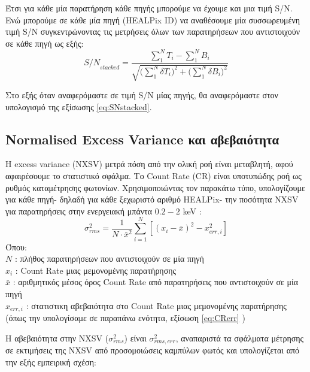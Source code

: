 Έτσι για κάθε μία παρατήρηση κάθε πηγής μπορούμε να έχουμε και μια τιμή \textlatin{S/N}.
Ενώ μπορούμε σε κάθε μία πηγή (\textlatin{HEALPix ID}) να αναθέσουμε μία συσσωρευμένη τιμή \textlatin{S/N} συγκεντρώνοντας τις μετρήσεις όλων των παρατηρήσεων που αντιστοιχούν σε κάθε πηγή ως εξής:
 \begin{equation} {S/N}_{stacked} =   \dfrac { \sum_1^N T_i -  \sum_1^N  B_i}{\sqrt{ \big(\sum_1^N \delta T_i \big)^2 + \big(\sum_1^N \delta B_i \big)^2}} \label{eq:SNstacked}\end{equation} 
 
Στο εξής όταν αναφερόμαστε σε τιμή \textlatin{S/N} μίας πηγής, θα αναφερόμαστε στον υπολογισμό της εξίσωσης \ref{eq:SNstacked}.
   
\subsection{\textlatin{Νormalised Excess Variance} και αβεβαιότητα }

H \textlatin{excess variance (NXSV)} μετρά πόση από την ολική ροή είναι μεταβλητή, αφού αφαιρέσουμε το στατιστικό σφάλμα. Το \textlatin{Count Rate (CR)} είναι υποτυπώδης ροή ως ρυθμός καταμέτρησης φωτονίων. Χρησιμοποιώντας τον παρακάτω τύπο, υπολογίζουμε για κάθε πηγή- δηλαδή για κάθε ξεχωριστό αριθμό \textlatin{HEALPix}- την ποσότητα \textlatin{NXSV} για παρατηρήσεις στην ενεργειακή μπάντα $0.2-2$ \textlatin{keV} \cite{1997ApJ...476...70N}: 
    \begin{equation} \sigma^2_{rms} = \frac{1}{N \cdot {\bar x}^2 }   \sum_{i=1}^{N}  [ (x_i -\bar x)^2  - x_{err, i}^2]  \label{eq:NXSV}\end{equation}
Όπου:\\
$N$ : πλήθος παρατηρήσεων που αντιστοιχούν σε μία πηγή \\                              
$x_i$ : \textlatin{Count Rate} μιας μεμονομένης παρατήρησης \\             
$\bar x$ : αριθμητικός μέσος όρος \textlatin{Count Rate} από παρατηρήσεις που αντιστοιχούν σε μία πηγή\\ 
$x_{err, i}$ : στατιστικη αβεβαιότητα στο \textlatin{Count Rate} μιας μεμονομένης παρατήρησης (όπως την υπολογίσαμε σε παραπάνω ενότητα, εξίσωση \ref{eq:CRerr} )  %

Η αβεβαιότητα στην \textlatin{NXSV} ($\sigma^2_{rms}$) είναι $  \sigma^2_{rms, err}$, αναπαριστά τα σφάλματα μέτρησης σε εκτιμήσεις της \textlatin{NXSV} από προσομοιώσεις καμπύλων φωτός και υπολογίζεται από την εξής εμπειρική σχέση\cite{2003MNRAS.345.1271V}:     
  
